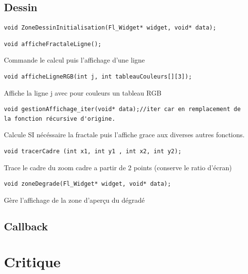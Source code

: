 \documentclass[a4paper,11pt]{article} \usepackage[T1]{fontenc} \usepackage[utf8]{inputenc} \usepackage[francais]{babel}
\begin{document}
\subsection{Dessin}
\begin{lstlisting}
void ZoneDessinInitialisation(Fl_Widget* widget, void* data);
\end{lstlisting}
\begin{lstlisting}
void afficheFractaleLigne();
\end{lstlisting}
Commande le calcul puis l'affichage d'une ligne
\begin{lstlisting}
void afficheLigneRGB(int j, int tableauCouleurs[][3]);
\end{lstlisting}
Affiche la ligne j avec pour couleurs un tableau RGB
\begin{lstlisting}
void gestionAffichage_iter(void* data);//iter car en remplacement de la fonction récursive d'origine.
\end{lstlisting}
Calcule SI nécéssaire la fractale puis l'affiche grace aux diverses autres fonctions.
\begin{lstlisting}
void tracerCadre (int x1, int y1 , int x2, int y2);
\end{lstlisting}
Trace le cadre du zoom cadre a partir de 2 points (conserve le ratio d'écran)
\begin{lstlisting}
void zoneDegrade(Fl_Widget* widget, void* data);
\end{lstlisting}
Gère l'affichage de la zone d’aperçu du dégradé

\subsection{Callback}%



\section{Critique}
\end{document}
